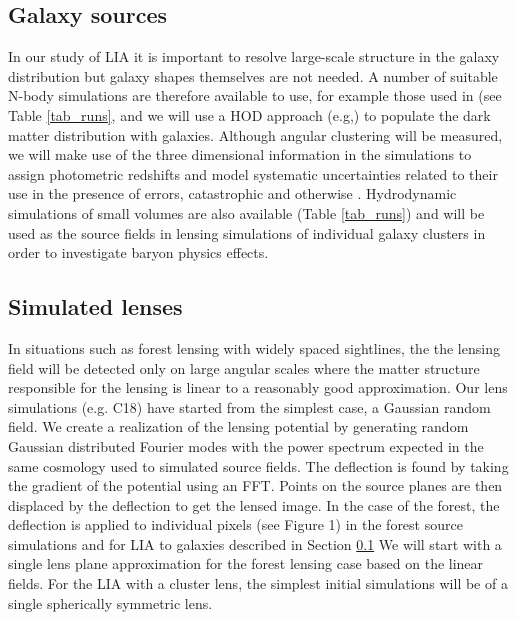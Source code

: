 \documentclass[12pt]{article}
\begin{document}
\begin{small}
\subsection{Galaxy sources}
\label{galaxysourcesims}
In our study of LIA it is important to resolve large-scale structure
in the galaxy distribution but galaxy shapes themselves are not needed.
A number of suitable N-body simulations are therefore 
available to use, for example
those used in \cite{zhu2017} (see Table \ref{tab_runs}, and we will use a HOD 
approach (e.g,) to populate the dark matter distribution with galaxies.
Although angular clustering will be measured, we will make use of the 
three dimensional information in the simulations to assign photometric
redshifts and model systematic uncertainties related to their use in 
the presence of errors, catastrophic and otherwise \citep{hearin2010}.
Hydrodynamic simulations of small volumes are also available 
(Table \ref{tab_runs}) and
will be used as the source fields in lensing simulations of individual
galaxy clusters in order to investigate baryon physics effects.


\subsection{Simulated lenses}
In situations such as forest lensing with widely spaced sightlines,
the 
the lensing field will be detected only on large angular scales 
where the matter structure responsible for the lensing is linear to a
reasonably good approximation. Our lens simulations (e.g. C18)
have started from the simplest case, a Gaussian random field.   
We create a realization of the lensing potential by generating random 
Gaussian  distributed Fourier modes with the power spectrum expected 
in the same cosmology
 used to simulated source fields.   The deflection is found by taking the 
gradient of the potential using an FFT.  Points on the source planes 
are then displaced by the deflection to get the lensed image. 
In the case of the forest, the deflection is applied to individual pixels
(see Figure 1) in the forest source simulations
 and for LIA to galaxies described in Section \ref{galaxysourcesims}
We will start with a single lens plane approximation for the forest lensing
case based on the linear fields. For the LIA with a cluster lens, the 
simplest initial simulations will be of a single spherically  symmetric lens.


\end{small}
\end{document}
